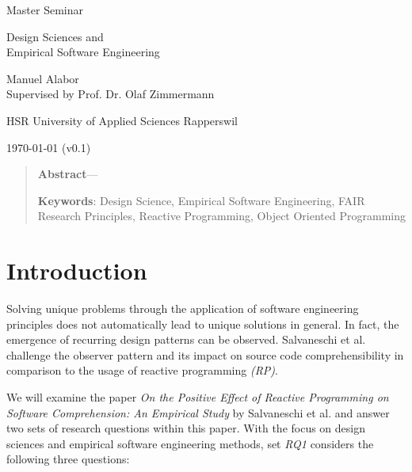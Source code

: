 \documentclass[12pt,a4paper]{article}
\newcommand{\version}{v0.1}
\begin{document}
\begin{centering}
	\Large{Master Seminar}
	\par
	\Huge{Design Sciences and\\Empirical Software Engineering}
	\par
	\vspace{2ex}

	\normalsize{
		Manuel Alabor\\
		Supervised by Prof. Dr. Olaf Zimmermann\\
		\par
		\vspace{2ex}
		HSR University of Applied Sciences Rapperswil\\
		\par
		\vspace{2ex}
		\today{} (\version)
	}
	\par
	\vspace{2ex}

	\begin{quotation}
		\small{
			\textbf{Abstract}---
		}
		\par
		\vspace{2ex}

		\small{
			\textbf{Keywords}: Design Science, Empirical Software Engineering, FAIR Research Principles, Reactive Programming, Object Oriented Programming
		}
		\par
		\vspace{4ex}
	\end{quotation}
\end{centering}

\section{Introduction}
Solving unique problems through the application of software engineering principles does not automatically lead to unique solutions in general. In fact, the emergence of recurring design patterns can be observed. Salvaneschi et al. \cite{7827078} challenge the observer pattern \cite{gamma1995design} and its impact on source code comprehensibility in comparison to the usage of reactive programming \emph{(RP)}.

We will examine the paper \emph{On the Positive Effect of Reactive Programming on Software Comprehension: An Empirical Study} by Salvaneschi et al. \cite{7827078} and answer two sets of research questions within this paper. With the focus on design sciences and empirical software engineering methods, set \emph{RQ1} considers the following three questions:
\end{document}
